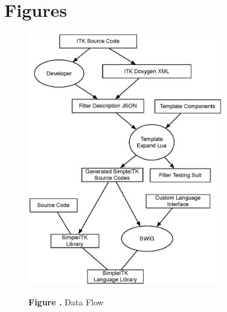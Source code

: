 \documentclass{frontiersMED} %
\begin{document}


\section*{Figures}


\begin{figure}
\begin{center}
\includegraphics[width=8.5cm]{images/fig1_dataflow}
\end{center}

 \textbf{\label{fig:01} Figure .}{ Data Flow }
\end{figure}




\end{document}

